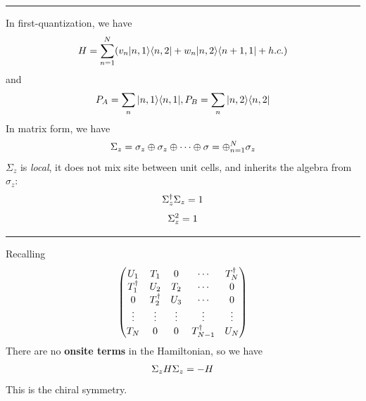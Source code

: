 \documentclass[letterpaper,10pt,english]{sphinxmanual}
\begin{document}
\bigskip\hrule{}\bigskip


In first-quantization, we have
\begin{gather}
\begin{split}H=\sum_{n=1}^N(v_n |n,1\rangle\langle n,2|+w_n|n,2\rangle\langle n+1,1|+h.c.)\end{split}\notag
\end{gather}
and
\begin{gather}
\begin{split}P_A=\sum_n |n,1\rangle\langle n,1|, P_B=\sum_n |n,2\rangle\langle n,2|\end{split}\notag
\end{gather}
In matrix form, we have
\begin{gather}
\begin{split}\Sigma_z=\sigma_z\oplus\sigma_z\oplus\cdots\oplus\sigma=\oplus_{n=1}^N \sigma_z\end{split}\notag
\end{gather}
\(\Sigma_z\) is \emph{local}, it does not mix site between unit cells,
and inherits the algebra from \(\sigma_z\):
\begin{gather}
\begin{split}\Sigma_z^\dagger\Sigma_z=1\end{split}\notag
\end{gather}\begin{gather}
\begin{split}\Sigma_z^2=1\end{split}\notag
\end{gather}

\bigskip\hrule{}\bigskip


Recalling
\begin{gather}
\begin{split}\begin{pmatrix} U_1 & T_1 &0 & \cdots&T_N^\dagger\\
T_1^\dagger &U_2&T_2&\cdots&0\\
0&T_2^\dagger&U_3&\cdots&0\\
\vdots&\vdots&\vdots&\vdots&\vdots\\
T_N&0&0&T_{N-1}^\dagger&U_N
\end{pmatrix}\end{split}\notag
\end{gather}
There are no \textbf{onsite terms} in the Hamiltonian, so we have
\begin{gather}
\begin{split}\Sigma_z H \Sigma_z=-H\end{split}\notag
\end{gather}
This is the chiral symmetry.
\end{document}
